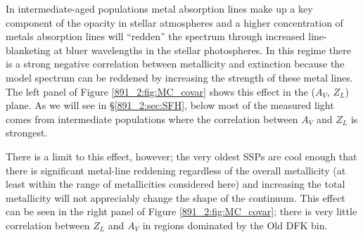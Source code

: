 
In intermediate-aged populations metal absorption lines make up a key
component of the opacity in stellar atmospheres and a higher
concentration of metals absorption lines will ``redden'' the spectrum
through increased line-blanketing at bluer wavelengths in the stellar
photospheres. In this regime there is a strong negative correlation
between metallicity and extinction because the model spectrum can be
reddened by increasing the strength of these metal lines. The left
panel of Figure \ref{891_2:fig:MC_covar} shows this effect in the ($A_V$,
$Z_L$) plane. As we will see in \S\ref{891_2:sec:SFH}, below 
most of the measured light comes from intermediate populations where
the correlation between $A_V$ and $Z_L$ is strongest.

There is a limit to this effect, however; the very oldest SSPs are
cool enough that there is significant metal-line reddening regardless
of the overall metallicity (at least within the range of metallicities
considered here) and increasing the total metallicity will not
appreciably change the shape of the continuum. This effect can be seen
in the right panel of Figure \ref{891_2:fig:MC_covar}; there is very little
correlation between $Z_L$ and $A_V$ in regions dominated by the Old
DFK bin.


